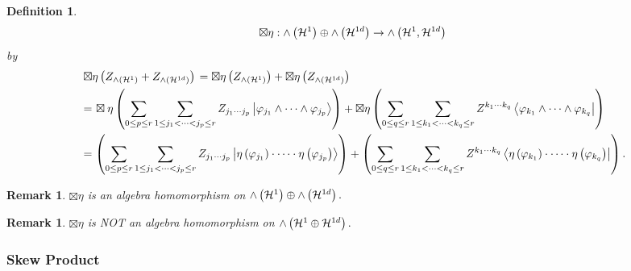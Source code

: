 \documentclass[aps,preprint]{revtex4}%
\newtheorem{definition}[theorem]{Definition}
\newtheorem{remark}[theorem]{Remark}
\begin{document}
\begin{definition}%
\begin{equation}
\boxtimes\eta:{\huge \wedge}\left(  \mathcal{H}^{1}\right)  \oplus
{\huge \wedge}\left(  \mathcal{H}^{1d}\right)  \rightarrow{\huge \wedge
}\left(  \mathcal{H}^{1},\mathcal{H}^{1d}\right)
\end{equation}
by%
\begin{align}
&  \left.  \boxtimes\eta\left(  Z_{{\huge \wedge}\left(  \mathcal{H}%
^{1}\right)  }+Z_{{\huge \wedge}\left(  \mathcal{H}^{1d}\right)  }\right)
\right.  =\boxtimes\eta\left(  Z_{{\huge \wedge}\left(  \mathcal{H}%
^{1}\right)  }\right)  +\boxtimes\eta\left(  Z_{{\huge \wedge}\left(
\mathcal{H}^{1d}\right)  }\right) \\
&  \left.  =\right.  \boxtimes\eta\left(  \sum_{0\leq p\leq r}\sum_{1\leq
j_{1}<\cdots<j_{p}\leq r}Z_{j_{1}\cdots j_{p}}\left\vert \varphi_{j_{1}}%
\wedge\cdots\wedge\varphi_{j_{p}}\right\rangle \right)  +\boxtimes\eta\left(
\sum_{0\leq q\leq r}\sum_{1\leq k_{1}<\cdots<k_{q}\leq r}Z^{k_{1}\cdots k_{q}%
}\left\langle \varphi_{k_{1}}\wedge\cdots\wedge\varphi_{k_{q}}\right\vert
\right) \\
&  \left.  =\right.  \left(  \sum_{0\leq p\leq r}\sum_{1\leq j_{1}%
<\cdots<j_{p}\leq r}Z_{j_{1}\cdots j_{p}}\left\vert \eta\left(  \varphi
_{j_{1}}\right)  \cdot\cdots\cdot\eta\left(  \varphi_{j_{p}}\right)
\right\rangle \right)  +\left(  \sum_{0\leq q\leq r}\sum_{1\leq k_{1}%
<\cdots<k_{q}\leq r}Z^{k_{1}\cdots k_{q}}\left\langle \eta\left(
\varphi_{k_{1}}\right)  \cdot\cdots\cdot\eta\left(  \varphi_{k_{q}}\right)
\right\vert \right)  .
\end{align}

\end{definition}

\begin{remark}
$\boxtimes\eta$ \emph{is an algebra homomorphism} on ${\huge \wedge}\left(
\mathcal{H}^{1}\right)  \oplus{\huge \wedge}\left(  \mathcal{H}^{1d}\right)
.$
\end{remark}

\begin{remark}
$\boxtimes\eta$ \emph{is NOT an algebra homomorphism} on ${\huge \wedge
}\left(  \mathcal{H}^{1}\oplus\mathcal{H}^{1d}\right)  .$
\end{remark}

\subsubsection{Skew Product}
\end{document}
